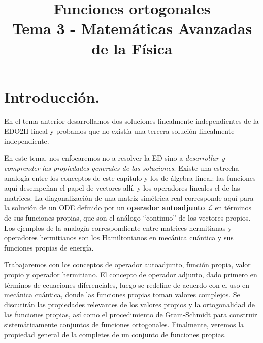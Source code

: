 
\title{Funciones ortogonales \\ {\large Tema 3 - Matemáticas Avanzadas de la Física}\vspace{-3ex}}
\author{}
\date{ }

\maketitle
\fontsize{14}{14}\selectfont
\section{Introducción.}
En el tema anterior desarrollamos dos soluciones linealmente independientes de la EDO2H lineal y probamos que no existía una tercera solución linealmente independiente. 
\par
En este tema, nos enfocaremos no a resolver la ED sino a \emph{desarrollar y comprender las propiedades generales de las soluciones}. Existe una estrecha analogía entre los conceptos de este capítulo y los de álgebra lineal: las funciones aquí desempeñan el papel de vectores allí, y los operadores lineales el de las matrices. La diagonalización de una matriz simétrica real corresponde aquí para la solución de un ODE definido por un \textbf{operador autoadjunto} $\mathcal{L}$ en términos de sus funciones propias, que son el análogo \enquote{continuo} de los vectores propios. Los ejemplos de la analogía correspondiente entre matrices hermitianas y operadores hermitianos son los Hamiltonianos en mecánica cuántica y sus funciones propias de energía.
\par
Trabajaremos con los conceptos de operador autoadjunto, función propia, valor propio y operador hermitiano. El concepto de operador adjunto, dado primero en términos de ecuaciones diferenciales, luego se redefine de acuerdo con el uso en mecánica cuántica, donde las funciones propias toman valores complejos. Se discutirán las propiedades relevantes de los valores propios y la ortogonalidad de las funciones propias, así como el procedimiento de Gram-Schmidt para construir sistemáticamente conjuntos de funciones ortogonales. Finalmente, veremos la propiedad general de la completes de un conjunto de funciones propias.
